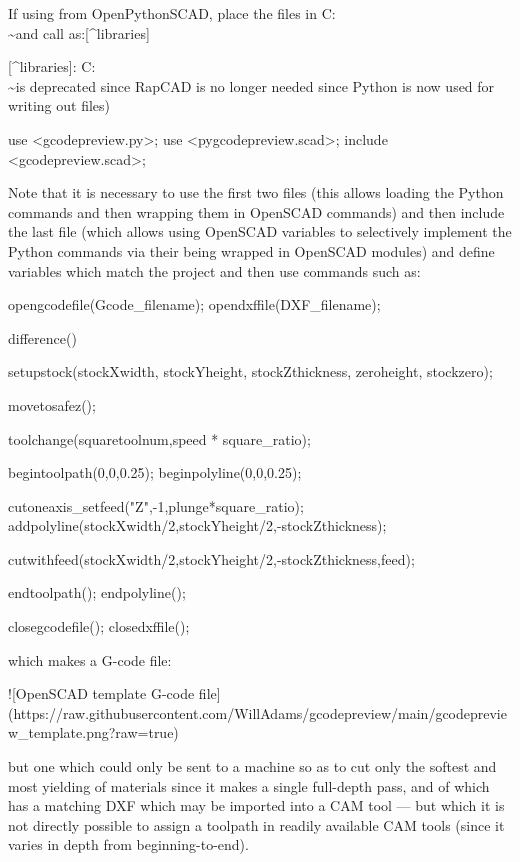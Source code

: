 \documentclass{ltxdoc}
\begin{document}
\begin{readme}
If using from OpenPythonSCAD, place the files in C:\Users\\\~\Documents\OpenSCAD\libraries and call as:[^libraries]

[^libraries]: C:\Users\\\~\Documents\RapCAD\libraries is deprecated since RapCAD is no longer needed since Python is now used for writing out files)

    use <gcodepreview.py>;
    use <pygcodepreview.scad>;
    include <gcodepreview.scad>;

Note that it is necessary to use the first two files (this allows loading the Python commands and then wrapping them in OpenSCAD commands) and then include the last file (which allows using OpenSCAD variables to selectively implement the Python commands via their being wrapped in OpenSCAD modules) and define variables which match the project and then use commands such as:

    opengcodefile(Gcode_filename);
    opendxffile(DXF_filename);
    
    difference() {
        setupstock(stockXwidth, stockYheight, stockZthickness, zeroheight, stockzero);
    
    movetosafez();
    
    toolchange(squaretoolnum,speed * square_ratio);
    
    begintoolpath(0,0,0.25);
    beginpolyline(0,0,0.25);

    cutoneaxis_setfeed("Z",-1,plunge*square_ratio);
    addpolyline(stockXwidth/2,stockYheight/2,-stockZthickness);
    
    cutwithfeed(stockXwidth/2,stockYheight/2,-stockZthickness,feed);
    
    endtoolpath();
    endpolyline();
    
    }
    
    closegcodefile();
    closedxffile();

which makes a G-code file:

![OpenSCAD template G-code file](https://raw.githubusercontent.com/WillAdams/gcodepreview/main/gcodepreview_template.png?raw=true)

but one which could only be sent to a machine so as to cut only the softest and most yielding of materials since it makes a single full-depth pass, and of which has a matching DXF which may be imported into a CAM tool --- but which it is not directly possible to assign a toolpath in readily available CAM tools (since it varies in depth from beginning-to-end). 


\end{readme}
\end{document}
